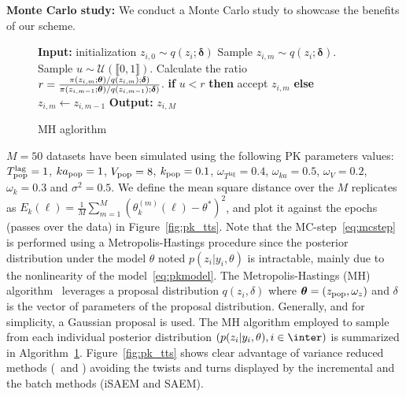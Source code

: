 \documentclass[12pt]{article}
\begin{document}
\medskip
\noindent \textbf{Monte Carlo study:}
We conduct a Monte Carlo study to showcase the benefits of our scheme.
\begin{figure}\vspace{-0.4in}
\begin{minipage}{\linewidth}
\begin{algorithm}[H]
\begin{algorithmic}[1]
\STATE \textbf{Input:} initialization $z_{i,0} \sim q(z_{i}; {\bm \delta})$
\STATE Sample $z_{i,m} \sim q(z_{i}; {\bm \delta})$.
\STATE Sample $u \sim \mathcal{U}(\llbracket 0, 1 \rrbracket)$.
\STATE Calculate the ratio $r = \frac{\pi(z_{i,m}; {\bm{\theta}})/q(z_{i,m}); {\bm \delta})}{\pi(z_{i,m-1}; {\bm{\theta}})/q(z_{i,m-1}); {\bm \delta})}$.
\STATE \textbf{if} $u < r$ \textbf{then} accept $z_{i,m}$ \textbf{else} $z_{i,m} \leftarrow z_{i,m-1}$
\ENDFOR
\STATE \textbf{Output:} $z_{i,M}$
\end{algorithmic}
\caption{MH aglorithm}
\label{alg:mh}
        \end{algorithm}
\end{minipage}\end{figure}
$M=50$ datasets have been simulated using the following PK parameters values:
$T^{\textrm{lag}}_{\rm pop} =1$, $ka_{\rm pop} =1$, $V_{\rm pop}= 8$, $k_{\rm pop}=0.1$, $ \omega_{T^{\textrm{lag}}}=0.4$, $\omega_{ka}=0.5$, $\omega_{V}=0.2$, $\omega_{k}=0.3$ and $\sigma^2=0.5$.
We define the mean square distance over the $M$ replicates as $E_k(\ell) = \frac{1}{M}\sum_{m=1}^{M}{\left(\theta_k^{(m)}(\ell) - \theta^* \right)^2} $, and plot it against the epochs (passes over the data) in Figure~\ref{fig:pk_tts}.	
Note that the { MC-step}~\eqref{eq:mcstep} is performed using a Metropolis-Hastings procedure since the posterior distribution under the model $\theta$ noted $p(z_i | y_i, \theta)$ is intractable, mainly due to the nonlinearity of the model~\eqref{eq:pkmodel}.
The Metropolis-Hastings (MH) algorithm~\citep{meyn2012markov} leverages a proposal distribution $q(z_{i}, \delta)$ where ${\bm{\theta}} = (z_{\rm pop}, \omega_{z})$ and $ \delta$ is the vector of parameters of the proposal distribution. Generally, and for simplicity, a Gaussian proposal is used. 
The MH algorithm employed to sample from each individual posterior distribution $\left(p(z_i | y_i, \theta), i\in \inter \right)$ is summarized in Algorithm~\ref{alg:mh}.
Figure~\ref{fig:pk_tts} shows clear advantage of variance reduced methods (\SAEMVR\ and \FISAEM ) avoiding the twists and turns displayed by the incremental and the batch methods (iSAEM and SAEM).
\end{document}

